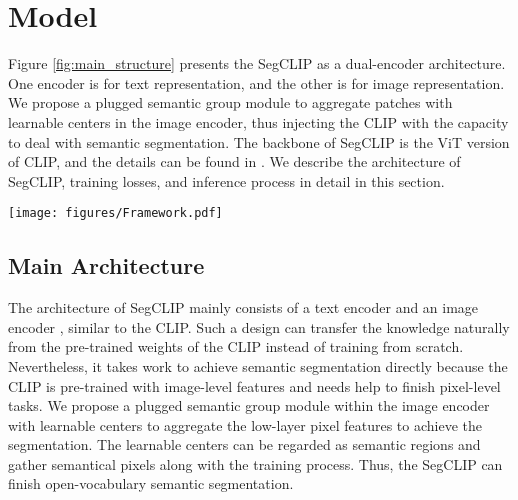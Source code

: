 \documentclass{article}
\theoremstyle{plain}
\theoremstyle{definition}
\theoremstyle{remark}
\begin{document}
\section{Model}
\label{sec_model}
Figure \ref{fig:main_structure} presents the SegCLIP as a dual-encoder architecture. One encoder is for text representation, and the other is for image representation. We propose a plugged semantic group module to aggregate patches with learnable centers in the image encoder, thus injecting the CLIP with the capacity to deal with semantic segmentation. The backbone of SegCLIP is the ViT version of CLIP, and the details can be found in \cite{Radford2021Learning}. We describe the architecture of SegCLIP, training losses, and inference process in detail in this section.
\begin{figure*}[htbp] 
    \centering
    \texttt{[image: figures/Framework.pdf]}
    \caption{\textbf{The framework of SegCLIP}. The SegCLIP is a dual-encoder architecture containing a text and image encoder. The semantic group module (zoom in at the right) is proposed to generate regular patches to arbitrary-shaped semantic regions. Three losses, including contrastive loss, reconstruction loss, and superpixel-based KL loss, are used in training.}
    \label{fig:main_structure}
\end{figure*}

\subsection{Main Architecture}
The architecture of SegCLIP mainly consists of a text encoder  and an image encoder , similar to the CLIP. Such a design can transfer the knowledge naturally from the pre-trained weights of the CLIP instead of training from scratch. Nevertheless, it takes work to achieve semantic segmentation directly because the CLIP is pre-trained with image-level features and needs help to finish pixel-level tasks. We propose a plugged semantic group module within the image encoder with learnable centers to aggregate the low-layer pixel features to achieve the segmentation. The learnable centers can be regarded as semantic regions and gather semantical pixels along with the training process. Thus, the SegCLIP can finish open-vocabulary semantic segmentation.
\end{document}
